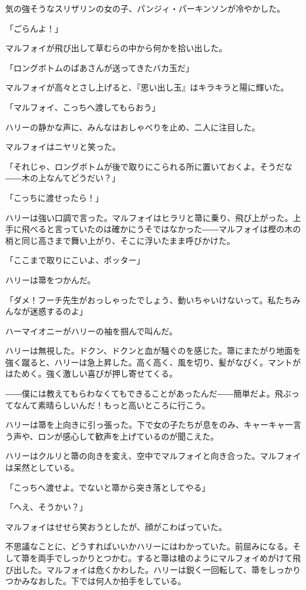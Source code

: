 \documentclass[10pt,a4paper]{article}
\begin{document}
\begin{CJK}{UTF8}{min}
気の強そうなスリザリンの女の子、パンジィ・パーキンソンが冷やかした。

「ごらんよ！」

マルフォイが飛び出して草むらの中から何かを拾い出した。

「ロングボトムのばあさんが送ってきたバカ玉だ」

マルフォイが高々とさし上げると、『思い出し玉』はキラキラと陽に輝いた。

「マルフォイ、こっちへ渡してもらおう」

ハリーの静かな声に、みんなはおしゃべりを止め、二人に注目した。

マルフォイはニヤリと笑った。

「それじゃ、ロングボトムが後で取りにこられる所に置いておくよ。そうだな――木の上なんてどうだい？」

「こっちに渡せったら！」

ハリーは強い口調で言った。マルフォイはヒラリと箒に乗り、飛び上がった。上手に飛べると言っていたのは確かにうそではなかった――マルフォイは樫の木の梢と同じ高さまで舞い上がり、そこに浮いたまま呼びかけた。

「ここまで取りにこいよ、ポッター」

ハリーは箒をつかんだ。

「ダメ！フーチ先生がおっしゃったでしょう、動いちゃいけないって。私たちみんなが迷惑するのよ」

ハーマイオニーがハリーの袖を掴んで叫んだ。

ハリーは無視した。ドクン、ドクンと血が騒ぐのを感じた。箒にまたがり地面を強く蹴ると、ハリーは急上昇した。高く高く、風を切り、髪がなびく。マントがはためく。強く激しい喜びが押し寄せてくる。

――僕には教えてもらわなくてもできることがあったんだ――簡単だよ。飛ぶってなんて素晴らしいんだ！もっと高いところに行こう。

ハリーは箒を上向きに引っ張った。下で女の子たちが息をのみ、キャーキャ一言う声や、ロンが感心して歓声を上げているのが聞こえた。

ハリーはクルリと箒の向きを変え、空中でマルフォイと向き合った。マルフォイは呆然としている。

「こっちへ渡せよ。でないと箒から突き落としてやる」

「へえ、そうかい？」

マルフォイはせせら笑おうとしたが、顔がこわばっていた。

不思議なことに、どうすればいいかハリーにはわかっていた。前屈みになる。そして箒を両手でしっかりとつかむ。すると箒は槍のようにマルフォイめがけて飛び出した。マルフォイは危くかわした。ハリーは鋭く一回転して、箒をしっかりつかみなおした。下では何人か拍手をしている。


\end{CJK}
\end{document}
